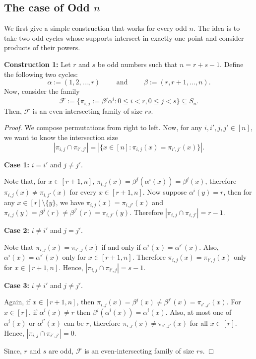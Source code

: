 \documentclass[12pt]{article}
\theoremstyle{definition}
\newcommand{\1}{\mathbf 1}
\begin{document}
\subsection{The case of  Odd  \texorpdfstring{$n$}{n}}
\label{subsec:Even_intersecting_family_odd_n}

We first give a simple construction that works for every odd $n$. The idea is to take two odd cycles whose supports intersect in exactly one point and consider products of their powers.

\textbf{Construction 1:} 
Let $r$ and $s$ be odd numbers such that $n=r+s-1$. Define the following two cycles:
$$\alpha:=(1, 2, \ldots, r)\qquad\text{ and }\qquad\beta:=(r,r+1,\ldots,n).$$
Now, consider the family
$$\mathcal{F}:=\{\pi_{i,j}:=\beta^j\alpha^i: 0\leq i<r, 0\leq j<s\}\subseteq S_n.$$
Then, $\mathcal{F}$ is an even-intersecting family of size $rs$.

\begin{proof}
We compose permutations from right to left. Now, for any $i,i',j,j'\in [n]$, we want to know the intersection size $$|\pi_{i,j}\cap \pi_{i',j'}|=|\{x\in[n]: \pi_{i,j}(x)=\pi_{i',j'}(x)\}|.$$

\textbf{Case 1:} $i= i'$ and $j\neq j'$.

Note that, for $x\in [r+1, n]$, $\pi_{i,j}(x)=\beta^j(\alpha^i(x))=\beta^j(x)$, therefore $\pi_{i,j}(x)\neq \pi_{i,j'}(x)$ for every $x\in [r+1,n]$. Now suppose $\alpha^i(y)=r$, then for any $x\in [r]\setminus\{y\}$, we have $\pi_{i,j}(x)= \pi_{i,j'}(x)$ and $\pi_{i,j}(y)=\beta^j(r)\neq\beta^{j'}(r)= \pi_{i,j'}(y)$. Therefore $|\pi_{i,j}\cap \pi_{i,j'}|=r-1$.

\textbf{Case 2:} $i\neq i'$ and $j= j'$.

Note that $\pi_{i,j}(x)=\pi_{i',j}(x)$ if and only if $\alpha^i(x)=\alpha^{i'}(x)$. Also, $\alpha^i(x)=\alpha^{i'}(x)$ only for $x\in [r+1, n]$. Therefore $\pi_{i,j}(x)=\pi_{i',j}(x)$ only for $x\in [r+1, n]$. Hence,  $|\pi_{i,j}\cap \pi_{i',j}|=s-1$.

\textbf{Case 3:} $i\neq i'$ and $j\neq j'$.

Again, if $x\in[r+1,n]$, then $\pi_{i,j}(x)=\beta^j(x)\neq \beta^{j'}(x)=\pi_{i',j'}(x)$. For $x\in [r]$, if $\alpha^i(x)\neq r$ then $\beta^j(\alpha^i(x))=\alpha^i(x)$. Also, at most one of $\alpha^i(x)$ or $\alpha^{i'}(x)$ can be $r$, therefore  $\pi_{i,j}(x)\neq\pi_{i',j'}(x)$ for all $x\in [r]$. Hence, $|\pi_{i,j}\cap \pi_{i',j'}|=0$.

Since, $r$ and $s$ are odd, $\mathcal{F}$ is an even-intersecting family of size $rs$. 
\end{proof}
\end{document}
